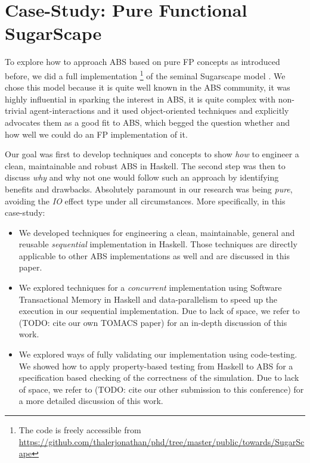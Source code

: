 \section{Case-Study: Pure Functional SugarScape}
\label{sec:case_study}

To explore how to approach ABS based on pure FP concepts as introduced before, we did a full implementation \footnote{The code is freely accessible from \url{https://github.com/thalerjonathan/phd/tree/master/public/towards/SugarScape}} of the seminal Sugarscape model \cite{epstein_growing_1996}. We chose this model because it is quite well known in the ABS community, it was highly influential in sparking the interest in ABS, it is quite complex with non-trivial agent-interactions and it used object-oriented techniques and explicitly advocates them as a good fit to ABS, which begged the question whether and how well we could do an FP implementation of it.

Our goal was first to develop techniques and concepts to show \textit{how} to engineer a clean, maintainable and robust ABS in Haskell. The second step was then to discuss \textit{why} and why not one would follow such an approach by identifying benefits and drawbacks. Absolutely paramount in our research was being \textit{pure}, avoiding the \textit{IO} effect type under all circumstances. More specifically, in this case-study:

\begin{itemize}
	\item We developed techniques for engineering a clean, maintainable, general and reusable \textit{sequential} implementation in Haskell. Those techniques are directly applicable to other ABS implementations as well and are discussed in this paper.
	
	\item We explored techniques for a \textit{concurrent} implementation using Software Transactional Memory in Haskell \cite{harris_composable_2005} and data-parallelism to speed up the execution in our sequential implementation. Due to lack of space, we refer to (TODO: cite our own TOMACS paper) for an in-depth discussion of this work.

	\item We explored ways of fully validating our implementation using code-testing. We showed how to apply property-based testing from Haskell \cite{claessen_quickcheck_2000} to ABS for a specification based checking of the correctness of the simulation. Due to lack of space, we refer to (TODO: cite our other submission to this conference) for a more detailed discussion of this work.
\end{itemize}

